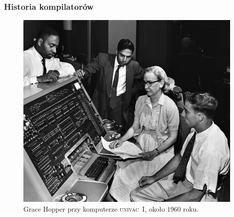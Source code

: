 \documentclass[10pt,t]{beamer}
\begin{document}
\begin{frame}
  \frametitle{Historia kompilatorów}

  \vspace{-0.5em}



  \begin{figure}

    \centering


    \includegraphics[scale=1.75]
    {./Presentations-pictures/Grace-Hopper-and-UNIVAC-I.jpeg}

    \caption{Grace Hopper przy komputerze \textsc{univac~I}, około
      $1960$ roku.}

  \end{figure}

\end{frame}
\end{document}
